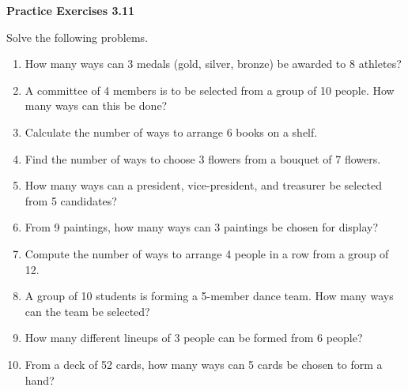 \vspace{0.3ex}
\noindent\textbf{Practice Exercises 3.11}

\vspace{0.2ex}

Solve the following problems. 

\begin{enumerate}[label=\color{blue}\arabic*.]
    \item How many ways can 3 medals (gold, silver, bronze) be awarded to 8 athletes?
    \item A committee of 4 members is to be selected from a group of 10 people. How many ways can this be done?
    \item Calculate the number of ways to arrange 6 books on a shelf.
    \item Find the number of ways to choose 3 flowers from a bouquet of 7 flowers.
    \item How many ways can a president, vice-president, and treasurer be selected from 5 candidates?
    \item From 9 paintings, how many ways can 3 paintings be chosen for display?
    \item Compute the number of ways to arrange 4 people in a row from a group of 12.
    \item A group of 10 students is forming a 5-member dance team. How many ways can the team be selected?
    \item How many different lineups of 3 people can be formed from 6 people?
    \item From a deck of 52 cards, how many ways can 5 cards be chosen to form a hand?
\end{enumerate}
